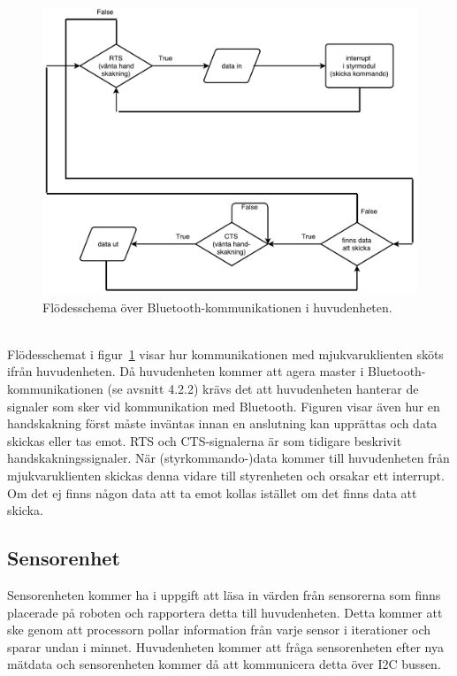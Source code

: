 \documentclass{article}
\begin{document}
\begin{figure}[H]
\centering
\includegraphics[scale=0.45]{Bluetooth_kommunikation_i_robot}
\caption{Flödesschema över Bluetooth-kommunikationen i huvudenheten.}
\label{fig:Bluetooth_kommunikation_i_robot}
\end{figure}
\ \\
Flödesschemat i figur~\ref{fig:Bluetooth_kommunikation_i_robot} visar hur kommunikationen med mjukvaruklienten sköts ifrån huvudenheten. Då huvudenheten kommer att agera master i Bluetooth-kommunikationen (se avsnitt 4.2.2) krävs det att huvudenheten hanterar de signaler som sker vid kommunikation med Bluetooth. Figuren visar även hur en handskakning först måste inväntas innan en anslutning kan upprättas och data skickas eller tas emot. RTS och CTS-signalerna är som tidigare beskrivit handskakningssignaler. När (styrkommando-)data kommer till huvudenheten från mjukvaruklienten skickas denna vidare till styrenheten och orsakar ett interrupt. Om det ej finns någon data att ta emot kollas istället om det finns data att skicka. 



\clearpage

\subsection{Sensorenhet}
Sensorenheten kommer ha i uppgift att läsa in värden från sensorerna som finns placerade på roboten och rapportera detta till huvudenheten. Detta kommer att ske genom att processorn pollar information från varje sensor i iterationer och sparar undan i minnet. Huvudenheten kommer att fråga sensorenheten efter nya mätdata och sensorenheten kommer då att kommunicera detta över I2C bussen.
\end{document}
